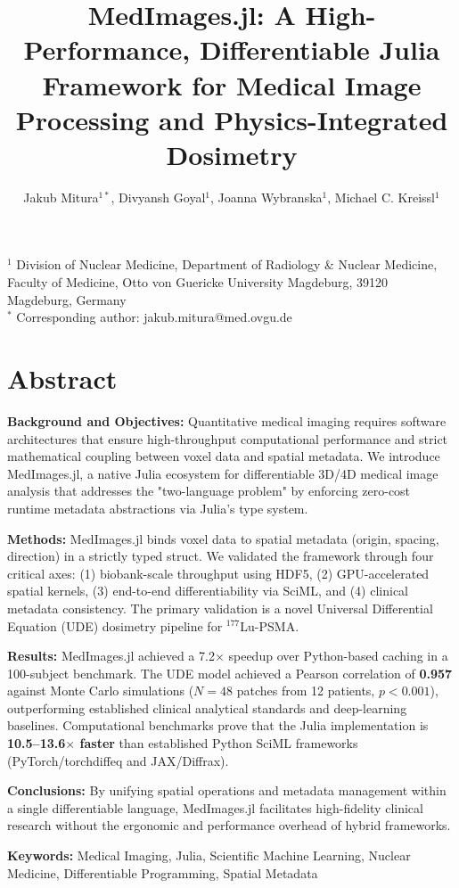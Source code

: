 \documentclass[10pt,letterpaper]{article}
\title{MedImages.jl: A High-Performance, Differentiable Julia Framework for Medical Image Processing and Physics-Integrated Dosimetry}
\author{Jakub Mitura$^{1*}$, Divyansh Goyal$^{1}$, Joanna Wybranska$^{1}$, Michael C. Kreissl$^{1}$}
\date{}
\begin{document}
\maketitle

\noindent
$^{1}$ Division of Nuclear Medicine, Department of Radiology \& Nuclear Medicine, Faculty of Medicine, Otto von Guericke University Magdeburg, 39120 Magdeburg, Germany \\
$^{*}$ Corresponding author: jakub.mitura@med.ovgu.de

\section*{Abstract}
\textbf{Background and Objectives:} Quantitative medical imaging requires software architectures that ensure high-throughput computational performance and strict mathematical coupling between voxel data and spatial metadata. We introduce MedImages.jl, a native Julia ecosystem for differentiable 3D/4D medical image analysis that addresses the "two-language problem" by enforcing zero-cost runtime metadata abstractions via Julia's type system. 

\textbf{Methods:} MedImages.jl binds voxel data to spatial metadata (origin, spacing, direction) in a strictly typed struct. We validated the framework through four critical axes: (1) biobank-scale throughput using HDF5, (2) GPU-accelerated spatial kernels, (3) end-to-end differentiability via SciML, and (4) clinical metadata consistency. The primary validation is a novel Universal Differential Equation (UDE) dosimetry pipeline for $^{177}$Lu-PSMA.

\textbf{Results:} MedImages.jl achieved a 7.2$\times$ speedup over Python-based caching in a 100-subject benchmark. The UDE model achieved a Pearson correlation of \textbf{0.957} against Monte Carlo simulations ($N=48$ patches from 12 patients, $p < 0.001$), outperforming established clinical analytical standards and deep-learning baselines. Computational benchmarks prove that the Julia implementation is \textbf{10.5--13.6$\times$ faster} than established Python SciML frameworks (PyTorch/torchdiffeq and JAX/Diffrax).

\textbf{Conclusions:} By unifying spatial operations and metadata management within a single differentiable language, MedImages.jl facilitates high-fidelity clinical research without the ergonomic and performance overhead of hybrid frameworks.

\textbf{Keywords:} Medical Imaging, Julia, Scientific Machine Learning, Nuclear Medicine, Differentiable Programming, Spatial Metadata
\end{document}
